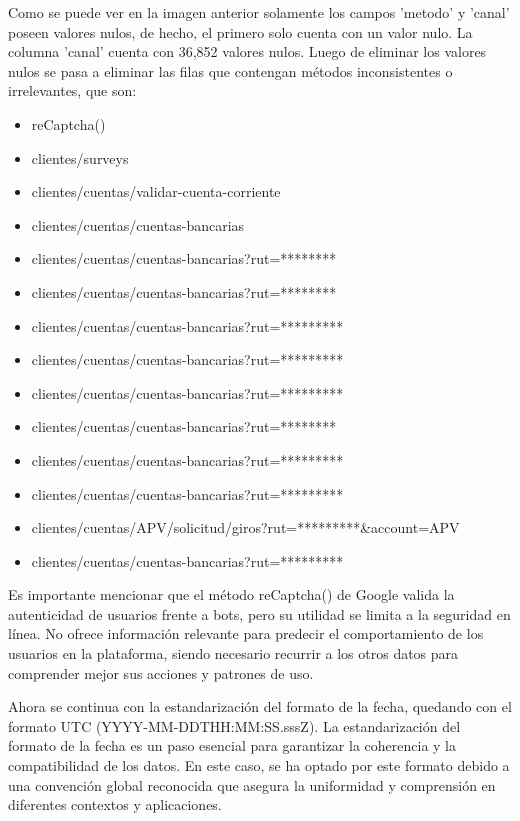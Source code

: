 Como se puede ver en la imagen anterior solamente los campos 'metodo' y 'canal' poseen valores nulos, de hecho, el primero solo cuenta con un valor nulo. La columna 'canal' cuenta con 36,852 valores nulos. Luego de eliminar los valores nulos se pasa a eliminar las filas que contengan métodos inconsistentes o irrelevantes, que son:
\begin{itemize}
    \item reCaptcha()
    \item clientes/surveys
    \item clientes/cuentas/validar-cuenta-corriente
    \item clientes/cuentas/cuentas-bancarias
    \item clientes/cuentas/cuentas-bancarias?rut=******** 
    \item clientes/cuentas/cuentas-bancarias?rut=********
    \item clientes/cuentas/cuentas-bancarias?rut=*********
    \item clientes/cuentas/cuentas-bancarias?rut=*********
    \item clientes/cuentas/cuentas-bancarias?rut=*********
    \item clientes/cuentas/cuentas-bancarias?rut=********
    \item clientes/cuentas/cuentas-bancarias?rut=*********
    \item clientes/cuentas/cuentas-bancarias?rut=*********
    \item clientes/cuentas/APV/solicitud/giros?rut=*********\&account=APV
    \item clientes/cuentas/cuentas-bancarias?rut=*********
\end{itemize}

Es importante mencionar que el método reCaptcha() de Google valida la autenticidad de usuarios frente a bots, pero su utilidad se limita a la seguridad en línea. No ofrece información relevante para predecir el comportamiento de los usuarios en la plataforma, siendo necesario recurrir a los otros datos para comprender mejor sus acciones y patrones de uso.

Ahora se continua con la estandarización del formato de la fecha, quedando con el formato UTC (YYYY-MM-DDTHH:MM:SS.sssZ). La estandarización del formato de la fecha es un paso esencial para garantizar la coherencia y la compatibilidad de los datos. En este caso, se ha optado por este formato debido a una convención global reconocida que asegura la uniformidad y comprensión en diferentes contextos y aplicaciones.

